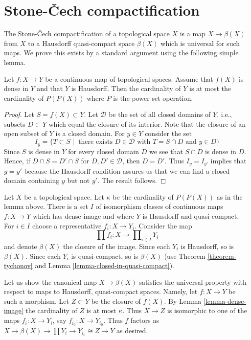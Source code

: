 \section{Stone-{\v C}ech compactification}
\label{section-stone-cech}

\noindent
The Stone-{\v C}ech compactification of a topological space $X$
is a map $X \to \beta(X)$ from $X$ to a Hausdorff quasi-compact space
$\beta(X)$ which is universal for such maps. We prove this exists
by a standard argument using the following simple lemma.

\begin{lemma}
\label{lemma-dense-image}
Let $f : X \to Y$ be a continuous map of topological spaces. Assume that
$f(X)$ is dense in $Y$ and that $Y$ is Hausdorff. Then the cardinality
of $Y$ is at most the cardinality of $P(P(X))$ where $P$ is the power
set operation.
\end{lemma}

\begin{proof}
Let $S = f(X) \subset Y$. Let $\mathcal{D}$ be the set of all
closed domains of $Y$, i.e., subsets $D \subset Y$ which
equal the closure of its interior. Note that the closure of an
open subset of $Y$ is a closed domain. For $y \in Y$ consider the set
$$
I_y = \{T \subset S \mid \text{ there exists }
D \in \mathcal{D}\text{ with }T = S \cap D\text{ and }y \in D\}
$$
Since $S$ is dense in $Y$ for every closed domain $D$ we see
that $S \cap D$ is dense in $D$. Hence, if
$D \cap S = D' \cap S$ for $D, D' \in \mathcal{D}$, then
$D = D'$. Thus $I_y = I_{y'}$ implies that $y = y'$ because the
Hausdorff condition assures us that we can find a closed domain
containing $y$ but not $y'$. The result follows.
\end{proof}

\noindent
Let $X$ be a topological space. Let $\kappa$ be the cardinality of
$P(P(X))$ as in the lemma above. There is a set $I$ of isomorphism
classes of continuous maps $f : X \to Y$ which has dense image and
where $Y$ is Hausdorff and quasi-compact. For $i \in I$ choose a
representative $f_i : X \to Y_i$. Consider the map
$$
\prod f_i : X \longrightarrow \prod\nolimits_{i \in I} Y_i
$$
and denote $\beta(X)$ the closure of the image. Since each $Y_i$ is
Hausdorff, so is $\beta(X)$. Since each $Y_i$ is quasi-compact, so
is $\beta(X)$ (use Theorem \ref{theorem-tychonov} and
Lemma \ref{lemma-closed-in-quasi-compact}).

\medskip\noindent
Let us show the canonical map $X \to \beta(X)$ satisfies the universal
property with respect to maps to Hausdorff, quasi-compact spaces. Namely,
let $f : X \to Y$ be such a morphism. Let $Z \subset Y$ be the closure
of $f(X)$. By Lemma \ref{lemma-dense-image} the cardinality of $Z$
is at most $\kappa$. Thus $X \to Z$ is isomorphic to one of the maps
$f_i : X \to Y_i$, say $f_{i_0} : X \to Y_{i_0}$. Thus $f$ factors as
$X \to \beta(X) \to \prod Y_i \to Y_{i_0} \cong Z \to Y$ as desired.

